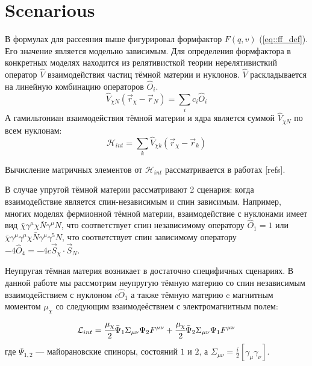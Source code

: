 \documentclass[a4paper, 14pt]{article}
\begin{document}
	
	\section{Scenarious}
	В формулах для рассеяния выше фигурировал формфактор $F(q,v)$ (\ref{eq::ff_def}). Его значение является модельно зависимым. Для определения формфактора в конкретных моделях находится из релятивисткой теории нерелятивисткий оператор $\hat{V}$ взаимодействия частиц тёмной материи и нуклонов.
$\hat{V}$ раскладывается на линейную комбинацию операторов $\hat{O}_i$.
\begin{equation}
	\hat{V}_{\chi N}(\vec{r}_{\chi} - \vec{r}_{N}) = \sum_i{c_i \hat{O}_i} 
\end{equation}
А гамильтониан взаимодействия тёмной материи и ядра является суммой $\hat{V}_{\chi N}$ по всем нуклонам:
\begin{equation}
	\mathcal{H}_{int} = \sum_{k}{\hat{V}_{\chi k}(\vec{r}_{\chi} - \vec{r}_{k})} 
\end{equation}

Вычисление матричных элементов от $\mathcal{H}_{int}$ рассматривается в работах [refs]. 

В случае упругой тёмной материи рассматривают 2 сценария: когда взаимодействие является спин-независимым и спин зависимым. 
Например, многих моделях фермионной тёмной материи, взаимодействие с нуклонами имеет вид $\bar{\chi}\gamma^{\mu}\chi \bar{N}\gamma^{\mu}N$, что соответствует спин независимому оператору $\hat{O}_1 = 1$ или $\bar{\chi}\gamma^{\mu}\gamma^{\mu}\chi \bar{N}\gamma^{\mu}\gamma^{5}N$, что соответствует спин зависимому оператору $-4\hat{O}_4 = -4c \vec{S}_{\chi}\cdot\vec{S}_{N}$.

Неупругая тёмная материя возникает в достаточно специфичных сценариях. В данной работе мы рассмотрим неупругую тёмную материю со спин независимым взаимодействием с нуклоном $c \hat{O}_1$ а также тёмную материю c магнитным моментом $\mu_{\chi}$ со следующим взаимодеёствием с электромагнитным полем:
	\begin{equation*}
	\mathcal{L}_{int} = \cfrac{\mu_{\chi}}{2} \bar{\Psi}_1 \Sigma_{\mu\nu} \Psi_2 F^{\mu\nu} + \cfrac{\mu_{\chi}}{2} \bar{\Psi}_2 \Sigma_{\mu\nu} \Psi_1 F^{\mu\nu} 
\end{equation*}
где ${\Psi}_{1,2}$ --- майорановские спиноры, состояний $1$ и $2$, а $\Sigma_{\mu\nu} = \frac{i}{2}[\gamma_{\mu}\gamma_{\nu}]$.
\end{document}
